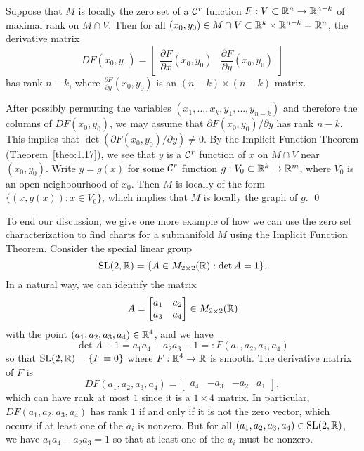 \begin{pf}
    Suppose that $M$ is locally the zero set of a ${\cal C}^r$ function $F : 
    V \subset \mathbb{R}^n \to \mathbb{R}^{n-k}$ of maximal rank on $M \cap V$. Then 
    for all $(x_0, y_0) \in M \cap V \subset \mathbb{R}^k \times \mathbb{R}^{n-k} = \mathbb{R}^n$, 
    the derivative matrix 
    \[ DF(x_0, y_0) = \left[ \begin{array}{c|c}
        \!\!\dfrac{\partial F}{\partial x}(x_0, y_0) & \dfrac{\partial F}{\partial y}(x_0, y_0)\!\!
    \end{array} \right] \] 
    has rank $n-k$, where $\frac{\partial F}{\partial y}(x_0, y_0)$ is 
    an $(n-k) \times (n-k)$ matrix.

    After possibly permuting the variables $(x_1, \dots, x_k, y_1, \dots, 
    y_{n-k})$ and therefore the columns of $DF(x_0, y_0)$, we may assume that 
    $\partial F(x_0, y_0)/\partial y$ has rank $n-k$. This implies that 
    $\det(\partial F(x_0, y_0)/\partial y) \neq 0$. By the Implicit 
    Function Theorem (Theorem~\ref{theo:1.17}), we see that $y$ 
    is a ${\cal C}^r$ function of $x$ on $M \cap V$ near $(x_0, y_0)$. 
    Write $y = g(x)$ for some ${\cal C}^r$ function $g : V_0 \subset \mathbb{R}^k 
    \to \mathbb{R}^m$, where $V_0$ is an open neighbourhood of $x_0$. 
    Then $M$ is locally of the form $\{(x, g(x)) : x \in V_0\}$,
    which implies that $M$ is locally the graph of $g$. \qed 
\end{pf}\vspace{-0.25cm}

To end our discussion, we give one more example of how we can use the 
zero set characterization to find charts for a submanifold $M$ 
using the Implicit Function Theorem. Consider the special linear group 
\[ \operatorname{SL}(2, \mathbb{R}) = \{A \in M_{2\times 2}(\mathbb{R}) : \det A = 1\}. \] 
In a natural way, we can identify the matrix 
\[ A = \begin{bmatrix}
    a_1 & a_2 \\ a_3 & a_4 
\end{bmatrix} \in M_{2\times 2}(\mathbb{R}) \] 
with the point $(a_1, a_2, a_3, a_4) \in \mathbb{R}^4$, and we have 
\[ \det A - 1 = a_1 a_4 - a_2 a_3 - 1 =: F(a_1, a_2, a_3, a_4) \] 
so that $\operatorname{SL}(2, \mathbb{R}) = \{F \equiv 0\}$ where $F : \mathbb{R}^4 \to \mathbb{R}$ is smooth. 
The derivative matrix of $F$ is 
\[ DF(a_1, a_2, a_3, a_4) = \begin{bmatrix}
    a_4 & -a_3 & -a_2 & a_1
\end{bmatrix}, \] 
which can have rank at most $1$ since it is a $1 \times 4$ matrix.
In particular, $DF(a_1, a_2, a_3, a_4)$ has rank $1$ if and only if it is 
not the zero vector, which occurs if at least one of the $a_i$ is nonzero. But 
for all $(a_1, a_2, a_3, a_4) \in \operatorname{SL}(2, \mathbb{R})$, we have $a_1a_4 - a_2a_3 = 1$ 
so that at least one of the $a_i$ must be nonzero. 

